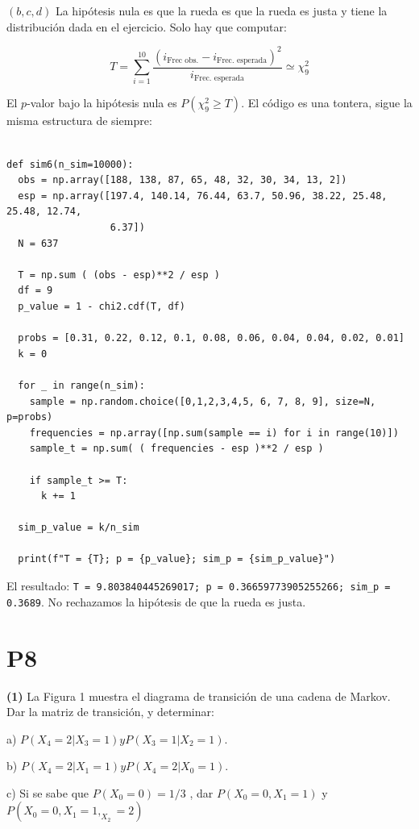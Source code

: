\documentclass[a4paper, 12pt]{article}
\begin{document}
$(b, c, d)$ La hipótesis nula es que la rueda es que la rueda es justa y tiene la
distribución dada en el ejercicio. Solo hay que computar:

\begin{equation*}
    T = \sum_{i=1}^{10} \frac{ (i_{\text{Frec obs.}} - i_\text{Frec. esperada})^2
    }{i_{\text{Frec. esperada}}} \simeq \chi_9^2
\end{equation*}

El $p$-valor bajo la hipótesis nula es $P(\chi_9^2 \geq T)$. El código es una
tontera, sigue la misma estructura de siempre:

\footnotesize 

\begin{verbatim}
    
def sim6(n_sim=10000):
  obs = np.array([188, 138, 87, 65, 48, 32, 30, 34, 13, 2])
  esp = np.array([197.4, 140.14, 76.44, 63.7, 50.96, 38.22, 25.48, 25.48, 12.74,
                  6.37])
  N = 637

  T = np.sum ( (obs - esp)**2 / esp )
  df = 9
  p_value = 1 - chi2.cdf(T, df)

  probs = [0.31, 0.22, 0.12, 0.1, 0.08, 0.06, 0.04, 0.04, 0.02, 0.01]
  k = 0

  for _ in range(n_sim):
    sample = np.random.choice([0,1,2,3,4,5, 6, 7, 8, 9], size=N, p=probs)
    frequencies = np.array([np.sum(sample == i) for i in range(10)])
    sample_t = np.sum( ( frequencies - esp )**2 / esp )

    if sample_t >= T:
      k += 1

  sim_p_value = k/n_sim

  print(f"T = {T}; p = {p_value}; sim_p = {sim_p_value}")

\end{verbatim}
\normalsize

El resultado: \texttt{T = 9.803840445269017; p = 0.36659773905255266; sim\_p =
0.3689}. No rechazamos la hipótesis de que la rueda es justa.








\pagebreak 

\section{P8}

\begin{myframe}
    \textbf{(1)} La Figura 1 muestra el diagrama de transición de una cadena de
    Markov. Dar la matriz de transición, y determinar:

a) $P(X_4 = 2 | X_3 = 1) y P(X_3 = 1 | X_2 = 1)$.

b) $P(X_4 = 2 | X_1 = 1) y P(X_4 = 2 | X_0 = 1)$.

c) Si se sabe que $P(X_0 = 0) = 1/3$
, dar $P(X_0 = 0, X_1 = 1)$ y $P(X_0 = 0,X_1 = 1,_X_2 = 2)$
\end{myframe}
\end{document}

